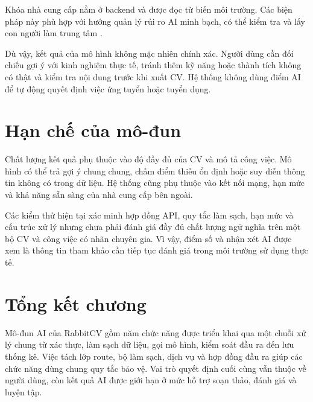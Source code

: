 Khóa nhà cung cấp nằm ở backend và được đọc từ biến môi trường. Các biện pháp này phù hợp với hướng quản lý rủi ro AI minh bạch, có thể kiểm tra và lấy con người làm trung tâm \cite{nistairmf}.

Dù vậy, kết quả của mô hình không mặc nhiên chính xác. Người dùng cần đối chiếu gợi ý với kinh nghiệm thực tế, tránh thêm kỹ năng hoặc thành tích không có thật và kiểm tra nội dung trước khi xuất CV. Hệ thống không dùng điểm AI để tự động quyết định việc ứng tuyển hoặc tuyển dụng.

\section{Hạn chế của mô-đun}

Chất lượng kết quả phụ thuộc vào độ đầy đủ của CV và mô tả công việc. Mô hình có thể trả gợi ý chung chung, chấm điểm thiếu ổn định hoặc suy diễn thông tin không có trong dữ liệu. Hệ thống cũng phụ thuộc vào kết nối mạng, hạn mức và khả năng sẵn sàng của nhà cung cấp bên ngoài.

Các kiểm thử hiện tại xác minh hợp đồng API, quy tắc làm sạch, hạn mức và cấu trúc xử lý nhưng chưa phải đánh giá đầy đủ chất lượng ngữ nghĩa trên một bộ CV và công việc có nhãn chuyên gia. Vì vậy, điểm số và nhận xét AI được xem là thông tin tham khảo cần tiếp tục đánh giá trong môi trường sử dụng thực tế.

\section{Tổng kết chương}

Mô-đun AI của RabbitCV gồm năm chức năng được triển khai qua một chuỗi xử lý chung từ xác thực, làm sạch dữ liệu, gọi mô hình, kiểm soát đầu ra đến lưu thống kê. Việc tách lớp route, bộ làm sạch, dịch vụ và hợp đồng đầu ra giúp các chức năng dùng chung quy tắc bảo vệ. Vai trò quyết định cuối cùng vẫn thuộc về người dùng, còn kết quả AI được giới hạn ở mức hỗ trợ soạn thảo, đánh giá và luyện tập.
